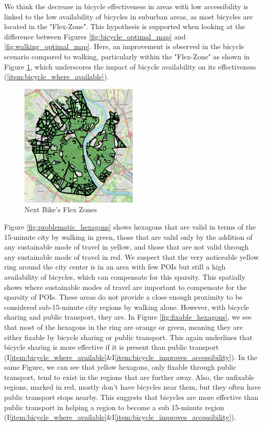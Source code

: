 We think the decrease in bicycle effectiveness in areas with low accessibility is linked to the low availability of bicycles in suburban areas, as most bicycles are located in the "Flex-Zone".
This hypothesis is supported when looking at the difference between Figures \ref{fig:bicycle_optimal_map} and \ref{fig:walking_optimal_map}. 
Here, an improvement is observed in the bicycle scenario compared to walking, particularly within the "Flex-Zone" as shown in Figure \ref{fig:flex_zones}, which underscores the impact of bicycle availability on its effectiveness (\ref{item:bicycle_where_available}).
\begin{figure}
  \begin{center}
    \includegraphics[width=0.50\textwidth]{Figures/discussion/flex_zones.png}
  \end{center}
  \caption{Next Bike's Flex Zones}
  \label{fig:flex_zones}
\end{figure}

Figure \ref{fig:problematic_hexagons} shows hexagons that are valid in terms of the 15-minute city by walking in green, those that are valid only by the addition of any sustainable mode of travel in yellow, and those that are not valid through any sustainable mode of travel in red.
We suspect that the very noticeable yellow ring around the city center is in an area with few POIs but still a high availability of bicycles, which can compensate for this sparsity.
This spatially shows where sustainable modes of travel are important to compensate for the sparsity of POIs.
These areas do not provide a close enough proximity to be considered sub-15-minute city regions by walking alone.
However, with bicycle sharing and public transport, they are.
In Figure \ref{fig:fixable_hexagons}, we see that most of the hexagons in the ring are orange or green, meaning they are either fixable by bicycle sharing or public transport.
This again underlines that bicycle sharing is more effective if it is present than public transport (I\ref{item:bicycle_where_available}\&I\ref{item:bicycle_improves_accessibility}).
In the same Figure, we can see that yellow hexagons, only fixable through public transport, tend to exist in the regions that are further away.
Also, the unfixable regions, marked in red,  mostly don't have bicycles near them, but they often have public transport stops nearby.
This suggests that bicycles are more effective than public transport in helping a region to become a sub 15-minute region (I\ref{item:bicycle_where_available}\&I\ref{item:bicycle_improves_accessibility}).

